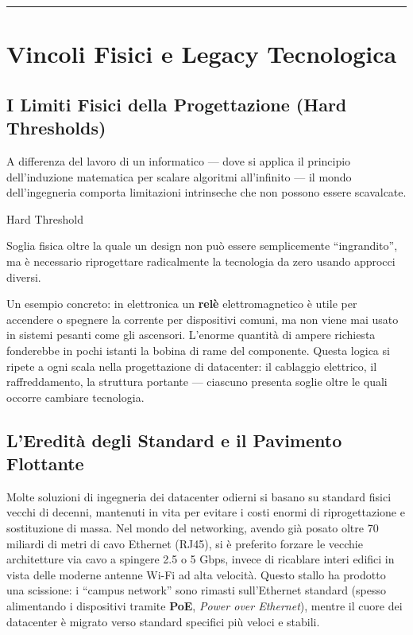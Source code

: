 \documentclass[
  italian,
  openany]{book}
\begin{document}
\begin{center}\rule{0.5\linewidth}{0.5pt}\end{center}

\section{Vincoli Fisici e Legacy
Tecnologica}\label{vincoli-fisici-e-legacy-tecnologica}

\subsection{I Limiti Fisici della Progettazione (Hard
Thresholds)}\label{i-limiti-fisici-della-progettazione-hard-thresholds}

A differenza del lavoro di un informatico --- dove si applica il
principio dell'induzione matematica per scalare algoritmi all'infinito
--- il mondo dell'ingegneria comporta limitazioni intrinseche che non
possono essere scavalcate.

\begin{calloutdefinition}{Hard Threshold}

Soglia fisica oltre la quale un design non può essere semplicemente
``ingrandito'', ma è necessario riprogettare radicalmente la tecnologia
da zero usando approcci diversi.

\end{calloutdefinition}

Un esempio concreto: in elettronica un \textbf{relè} elettromagnetico è
utile per accendere o spegnere la corrente per dispositivi comuni, ma
non viene mai usato in sistemi pesanti come gli ascensori. L'enorme
quantità di ampere richiesta fonderebbe in pochi istanti la bobina di
rame del componente. Questa logica si ripete a ogni scala nella
progettazione di datacenter: il cablaggio elettrico, il raffreddamento,
la struttura portante --- ciascuno presenta soglie oltre le quali
occorre cambiare tecnologia.

\subsection{L'Eredità degli Standard e il Pavimento
Flottante}\label{leredituxe0-degli-standard-e-il-pavimento-flottante}

Molte soluzioni di ingegneria dei datacenter odierni si basano su
standard fisici vecchi di decenni, mantenuti in vita per evitare i costi
enormi di riprogettazione e sostituzione di massa. Nel mondo del
networking, avendo già posato oltre 70 miliardi di metri di cavo
Ethernet (RJ45), si è preferito forzare le vecchie architetture via cavo
a spingere 2.5 o 5 Gbps, invece di ricablare interi edifici in vista
delle moderne antenne Wi-Fi ad alta velocità. Questo stallo ha prodotto
una scissione: i ``campus network'' sono rimasti sull'Ethernet standard
(spesso alimentando i dispositivi tramite \textbf{PoE}, \emph{Power over
Ethernet}), mentre il cuore dei datacenter è migrato verso standard
specifici più veloci e stabili.
\end{document}
